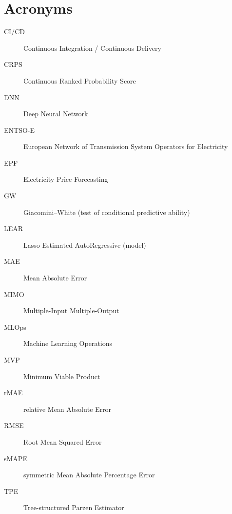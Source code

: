 \section*{Acronyms}
\begin{description}
  \item[CI/CD] Continuous Integration / Continuous Delivery
  \item[CRPS] Continuous Ranked Probability Score
  \item[DNN] Deep Neural Network
  \item[ENTSO-E] European Network of Transmission System Operators for Electricity
  \item[EPF] Electricity Price Forecasting
  \item[GW] Giacomini--White (test of conditional predictive ability)
  \item[LEAR] Lasso Estimated AutoRegressive (model)
  \item[MAE] Mean Absolute Error
  \item[MIMO] Multiple-Input Multiple-Output
  \item[MLOps] Machine Learning Operations
  \item[MVP] Minimum Viable Product
  \item[rMAE] relative Mean Absolute Error
  \item[RMSE] Root Mean Squared Error
  \item[sMAPE] symmetric Mean Absolute Percentage Error
  \item[TPE] Tree-structured Parzen Estimator
\end{description}
